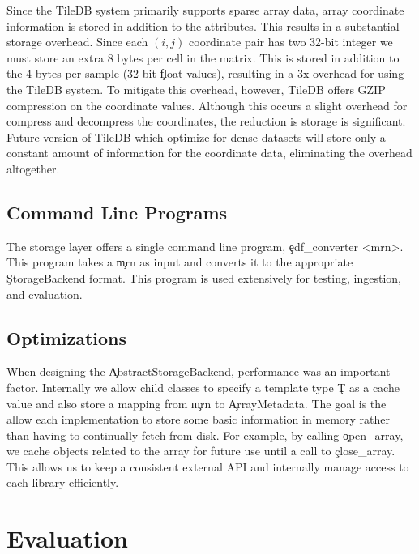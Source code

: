 Since the TileDB system primarily supports sparse array data, array coordinate
information is stored in addition to the attributes. This results in a
substantial storage overhead. Since each $(i, j)$ coordinate pair has two
32-bit integer we must store an extra 8 bytes per cell in the matrix. This is
stored in addition to the 4 bytes per sample (32-bit \c{float} values),
resulting in a 3x overhead for using the TileDB system. To mitigate this
overhead, however, TileDB offers GZIP compression on the coordinate values.
Although this occurs a slight overhead for compress and decompress the coordinates,
the reduction is storage is significant. \\

Future version of TileDB which optimize for dense datasets will store only a
constant amount of information for the coordinate data, eliminating the
overhead altogether.

\subsection{Command Line Programs}\label{storage-ch:implementation-cmd}

The storage layer offers a single command line program,
\c{edf\_converter <mrn>}.  This program takes a \c{mrn} as input
and converts it to the appropriate \c{StorageBackend} format. This
program is used extensively for testing, ingestion, and evaluation.

\subsection{Optimizations}\label{storage-ch:opt}

When designing the \c{AbstractStorageBackend}, performance was an important
factor. Internally we allow child classes to specify a template type \c{T} as
a cache value and also store a mapping from \c{mrn} to \c{ArrayMetadata}. The
goal is the allow each implementation to store some basic information in memory
rather than having to continually fetch from disk. For example, by calling 
\c{open\_array}, we cache objects related to the array for future
use until a call to \c{close\_array}. This allows us to keep a consistent
external API and internally manage access to each library efficiently.

\section{Evaluation}\label{storage-ch:evaluation}

